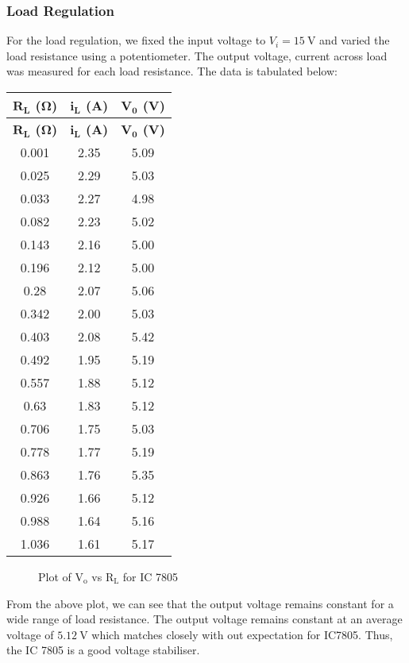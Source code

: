 \documentclass{scrartcl}
\begin{document}
\subsubsection{Load Regulation}
For the load regulation, we fixed the input voltage to $V_i = 15 \ \mathrm{V}$ and varied the load resistance using a potentiometer. The output voltage, current across load was measured for each load resistance. The data is tabulated below:
\begin{longtable}{|c|c|c|}
        \hline
        \textbf{$\mathbf{R_L}$ ($\mathbf{\Omega}$)} & \textbf{$\mathbf{i_L}$ (A)} & \textbf{$\mathbf{V_0}$ (V)} \\ \hline
        \endfirsthead
        
        \hline
        \textbf{$\mathbf{R_L}$ ($\mathbf{\Omega}$)} & \textbf{$\mathbf{i_L}$ (A)} & \textbf{$\mathbf{V_0}$ (V)} \\ \hline
        \endhead
        
        \hline
        \endfoot
        
        \hline
        \endlastfoot
        
        0.001      & 2.35      & 5.09 \\ \hline
        0.025      & 2.29      & 5.03 \\ \hline
        0.033      & 2.27      & 4.98 \\ \hline
        0.082      & 2.23      & 5.02 \\ \hline
        0.143      & 2.16      & 5.00 \\ \hline
        0.196      & 2.12      & 5.00 \\ \hline
        0.28       & 2.07      & 5.06 \\ \hline
        0.342      & 2.00      & 5.03 \\ \hline
        0.403      & 2.08      & 5.42 \\ \hline
        0.492      & 1.95      & 5.19 \\ \hline
        0.557      & 1.88      & 5.12 \\ \hline
        0.63       & 1.83      & 5.12 \\ \hline
        0.706      & 1.75      & 5.03 \\ \hline
        0.778      & 1.77      & 5.19 \\ \hline
        0.863      & 1.76      & 5.35 \\ \hline
        0.926      & 1.66      & 5.12 \\ \hline
        0.988      & 1.64      & 5.16 \\ \hline
        1.036      & 1.61      & 5.17 \\ \hline
        \end{longtable}
        \noindent
\begin{figure}[H]
        \centering
        
        \caption{Plot of $\mathrm{V_o}$ vs $\mathrm{R_L}$ for IC 7805}
\end{figure}
\noindent
From the above plot, we can see that the output voltage remains constant for a wide range of load resistance. The output voltage remains constant at an average voltage of $\SI{5.12}{\volt}$ which matches closely with out expectation for IC7805. Thus, the IC 7805 is a good voltage stabiliser.
\end{document}
